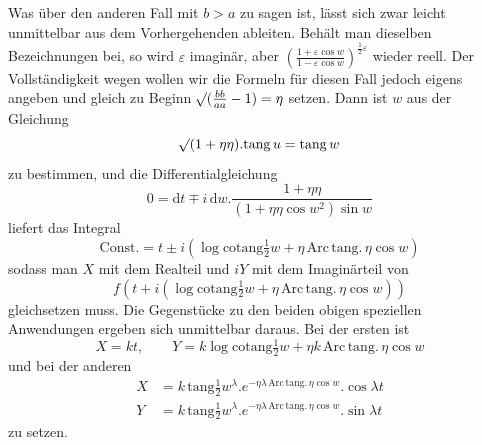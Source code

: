 Was über den anderen Fall mit \(b>a\) zu sagen ist, lässt sich zwar leicht unmittelbar aus dem Vorhergehenden ableiten. Behält man dieselben
Bezeichnungen bei, so wird \(\varepsilon\) imaginär, aber \((\frac{1+\varepsilon\cos w}{1-\varepsilon\cos w})^{\frac{1}{2}\varepsilon}\) wieder reell. Der Vollständigkeit wegen wollen wir die Formeln für diesen Fall jedoch eigens angeben und gleich zu Beginn \(\mathord{{}^{}\!\surd}(\frac{bb}{aa}-1)=\eta\) setzen. Dann ist \(w\) aus der Gleichung
\[
\mathord{{}^{}\!\surd}(1+\eta\eta)\mathord{.}\mathrm{tang}\,u=\mathrm{tang}\,w
\]
\noindent zu bestimmen, und die Differentialgleichung
\[
0=\mathrm{d}t\mp i\,\mathrm{d}w\mathord{.}\frac{1+\eta\eta}{(1+\eta\eta\cos w^2)\sin w}
\]
\noindent liefert das Integral
\[
\text{Const.}=t\pm i(\log\mathrm{cotang}\tfrac{1}{2}w+\eta\,\mathrm{Arc}\,\mathrm{tang}.\,\eta\cos w)
\]
\noindent sodass man \(X\) mit dem Realteil und \(iY\) mit dem Imaginärteil von
\[
f(t+i(\log\mathrm{cotang}\tfrac{1}{2}w+\eta\,\mathrm{Arc}\,\mathrm{tang}.\,\eta\cos w))
\]
\noindent gleichsetzen muss. Die Gegenstücke zu den beiden obigen speziellen Anwendungen ergeben sich unmittelbar daraus. Bei der ersten ist
\[
X=kt,\qquad Y=k\log\mathrm{cotang}\tfrac{1}{2}w+\eta k\,\mathrm{Arc}\,\mathrm{tang}.\,\eta\cos w
\]
\noindent und bei der anderen
\[
\begin{aligned}
X&=k\,\mathrm{tang}\tfrac{1}{2}w^{\lambda}\mathord{.}e^{-\eta\lambda\,\mathrm{Arc}\,\mathrm{tang}.\,\eta\cos w}\mathord{.}\cos\lambda t\\
Y&=k\,\mathrm{tang}\tfrac{1}{2}w^{\lambda}\mathord{.}e^{-\eta\lambda\,\mathrm{Arc}\,\mathrm{tang}.\,\eta\cos w}\mathord{.}\sin\lambda t
\end{aligned}
\]
\noindent zu setzen.

